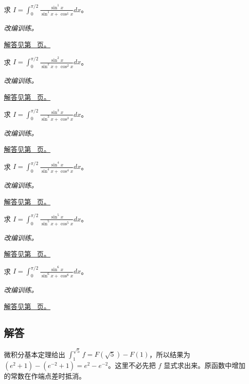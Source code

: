 \documentclass[UTF8,12pt,a4paper,fontset=fandol]{ctexart}
\begin{document}
\begin{example}[对称代换消去复杂分母]\label{ex:c17q21}
求 $I=\displaystyle\int_0^{\pi/2}\frac{\sin^{1}x}{\sin^{1}x+\cos^{1}x}dx$。
\par\textit{改编训练。}\par\hyperref[ans:c17q21]{解答见第~\pageref{ans:c17q21} 页。}
\end{example}
\begin{example}[对称代换消去复杂分母]\label{ex:c17q22}
求 $I=\displaystyle\int_0^{\pi/2}\frac{\sin^{2}x}{\sin^{2}x+\cos^{2}x}dx$。
\par\textit{改编训练。}\par\hyperref[ans:c17q22]{解答见第~\pageref{ans:c17q22} 页。}
\end{example}
\begin{example}[对称代换消去复杂分母]\label{ex:c17q23}
求 $I=\displaystyle\int_0^{\pi/2}\frac{\sin^{3}x}{\sin^{3}x+\cos^{3}x}dx$。
\par\textit{改编训练。}\par\hyperref[ans:c17q23]{解答见第~\pageref{ans:c17q23} 页。}
\end{example}
\begin{example}[对称代换消去复杂分母]\label{ex:c17q24}
求 $I=\displaystyle\int_0^{\pi/2}\frac{\sin^{4}x}{\sin^{4}x+\cos^{4}x}dx$。
\par\textit{改编训练。}\par\hyperref[ans:c17q24]{解答见第~\pageref{ans:c17q24} 页。}
\end{example}
\begin{example}[对称代换消去复杂分母]\label{ex:c17q25}
求 $I=\displaystyle\int_0^{\pi/2}\frac{\sin^{5}x}{\sin^{5}x+\cos^{5}x}dx$。
\par\textit{改编训练。}\par\hyperref[ans:c17q25]{解答见第~\pageref{ans:c17q25} 页。}
\end{example}
\begin{example}[对称代换消去复杂分母]\label{ex:c17q26}
求 $I=\displaystyle\int_0^{\pi/2}\frac{\sin^{6}x}{\sin^{6}x+\cos^{6}x}dx$。
\par\textit{改编训练。}\par\hyperref[ans:c17q26]{解答见第~\pageref{ans:c17q26} 页。}
\end{example}
\subsection{解答}
\begin{solve}\label{ans:c17q1}
微积分基本定理给出 $\int_1^{\sqrt5}f=F(\sqrt5)-F(1)$，所以结果为 $(e^2+1)-(e^{-2}+1)=e^2-e^{-2}$。这里不必先把 $f$ 显式求出来。原函数中增加的常数在作端点差时抵消。
\end{solve}
\end{document}
